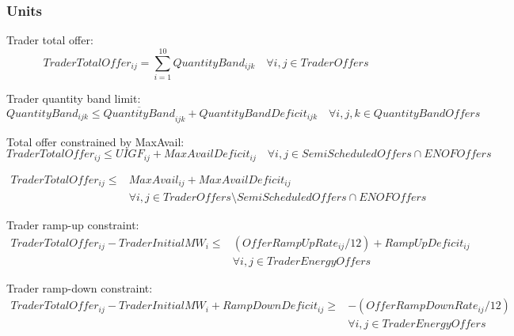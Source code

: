 \documentclass{article}
\begin{document}
\subsubsection{Units}

Trader total offer:
\begin{equation}
TraderTotalOffer_{ij} = \sum\limits_{i = 1}^{10} QuantityBand_{ijk} \quad \forall i,j \in TraderOffers
\end{equation}

Trader quantity band limit:
\begin{equation}
QuantityBand_{ijk} \leq \overline{QuantityBand}_{ijk} + QuantityBandDeficit_{ijk} \quad \forall i,j,k \in QuantityBandOffers
\end{equation}

Total offer constrained by MaxAvail:
\begin{equation}
TraderTotalOffer_{ij} \leq UIGF_{ij} + MaxAvailDeficit_{ij} \quad \forall i,j \in SemiScheduledOffers \cap ENOFOffers
\end{equation}

\begin{equation}
\begin{split}
TraderTotalOffer_{ij} \leq & MaxAvail_{ij} + MaxAvailDeficit_{ij} \\
& \forall i, j \in TraderOffers \setminus SemiScheduledOffers \cap ENOFOffers
\end{split}
\end{equation}


Trader ramp-up constraint:
\begin{equation}
\begin{split}
TraderTotalOffer_{ij} - TraderInitialMW_{i} \leq & (OfferRampUpRate_{ij} / 12) + RampUpDeficit_{ij} \\
& \forall i,j \in TraderEnergyOffers
\end{split}
\end{equation}


Trader ramp-down constraint:
\begin{equation}
\begin{split}
TraderTotalOffer_{ij} - TraderInitialMW_{i} + RampDownDeficit_{ij} \geq & - (OfferRampDownRate_{ij} / 12) \\
& \forall i,j \in TraderEnergyOffers
\end{split}
\end{equation}
\end{document}
